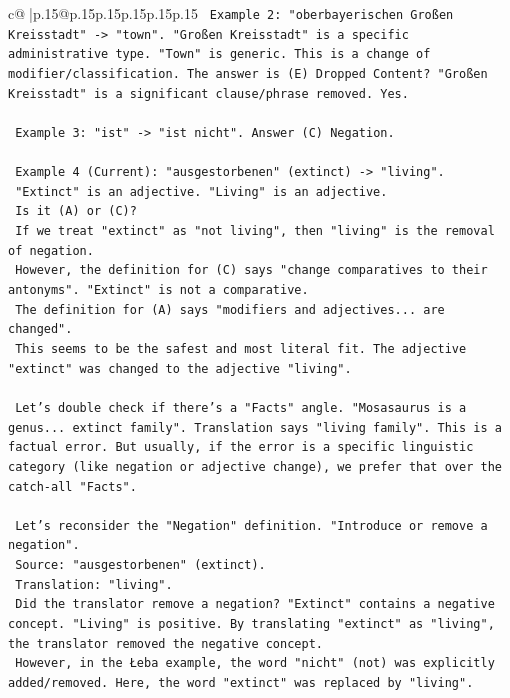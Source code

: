 \documentclass{article}
\begin{document}
{\begin{supertabular}{c@{$\;$}|p{.15\linewidth}@{}p{.15\linewidth}p{.15\linewidth}p{.15\linewidth}p{.15\linewidth}p{.15\linewidth}}
{{{\texttt{    Example 2: "oberbayerischen Großen Kreisstadt" {-}> "town". "Großen Kreisstadt" is a specific administrative type. "Town" is generic. This is a change of modifier/classification. The answer is (E) Dropped Content? "Großen Kreisstadt" is a significant clause/phrase removed. Yes.} \\
\\ 
\texttt{    Example 3: "ist" {-}> "ist nicht". Answer (C) Negation.} \\
\\ 
\texttt{    Example 4 (Current): "ausgestorbenen" (extinct) {-}> "living".} \\
\texttt{    "Extinct" is an adjective. "Living" is an adjective.} \\
\texttt{    Is it (A) or (C)?} \\
\texttt{    If we treat "extinct" as "not living", then "living" is the removal of negation.} \\
\texttt{    However, the definition for (C) says "change comparatives to their antonyms". "Extinct" is not a comparative.} \\
\texttt{    The definition for (A) says "modifiers and adjectives... are changed".} \\
\texttt{    This seems to be the safest and most literal fit. The adjective "extinct" was changed to the adjective "living".} \\
\\ 
\texttt{    Let's double check if there's a "Facts" angle. "Mosasaurus is a genus... extinct family". Translation says "living family". This is a factual error. But usually, if the error is a specific linguistic category (like negation or adjective change), we prefer that over the catch{-}all "Facts".} \\
\\ 
\texttt{    Let's reconsider the "Negation" definition. "Introduce or remove a negation".} \\
\texttt{    Source: "ausgestorbenen" (extinct).} \\
\texttt{    Translation: "living".} \\
\texttt{    Did the translator remove a negation? "Extinct" contains a negative concept. "Living" is positive. By translating "extinct" as "living", the translator removed the negative concept.} \\
\texttt{    However, in the Łeba example, the word "nicht" (not) was explicitly added/removed. Here, the word "extinct" was replaced by "living".} \\
}}}
\end{supertabular}}
\end{document}
